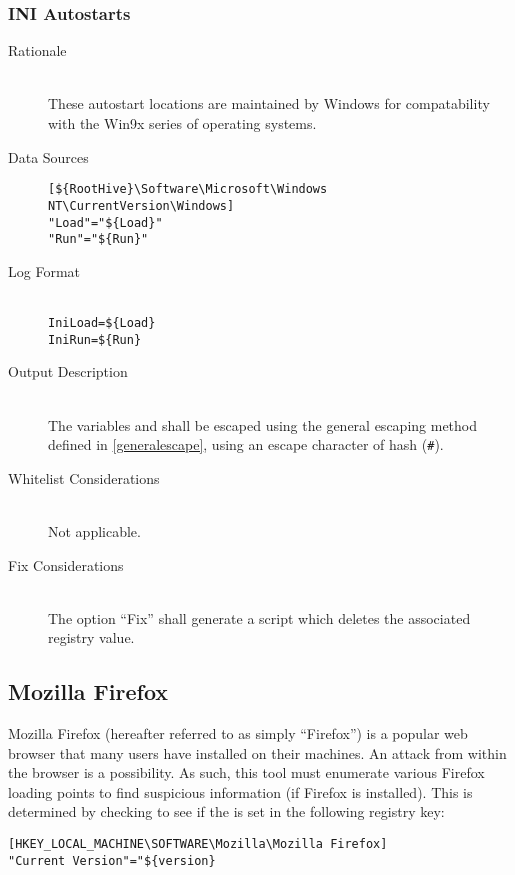 \subsubsection{INI Autostarts}
\begin{description}
\item[Rationale] \hfill \\
These autostart locations are maintained by Windows for compatability with the
Win9x series of operating systems.
\item[Data Sources] \hfill
\vspace{-\baselineskip}
\begin{verbatim}
[${RootHive}\Software\Microsoft\Windows NT\CurrentVersion\Windows]
"Load"="${Load}"
"Run"="${Run}"
\end{verbatim}
\item[Log Format] \hfill \\
\verb|IniLoad=${Load}| \\
\verb|IniRun=${Run}|
\item[Output Description] \hfill \\
The variables  and  shall be escaped using the general
escaping method defined in \ref{generalescape}, using an escape character of
hash (\verb|#|).
\item[Whitelist Considerations] \hfill \\
Not applicable.
\item[Fix Considerations] \hfill \\
The option ``Fix'' shall generate a script which deletes the associated
registry value.
\end{description}

\subsection{Mozilla Firefox}
Mozilla Firefox (hereafter referred to as simply ``Firefox'') is a popular web
browser that many users have installed on their machines.  An attack from within
the browser is a possibility.  As such, this tool must enumerate various Firefox
loading points to find suspicious information (if Firefox is installed).  This
is determined by checking to see if the  is set in the following
registry key:
\begin{verbatim}
[HKEY_LOCAL_MACHINE\SOFTWARE\Mozilla\Mozilla Firefox] 
"Current Version"="${version}
\end{verbatim}

